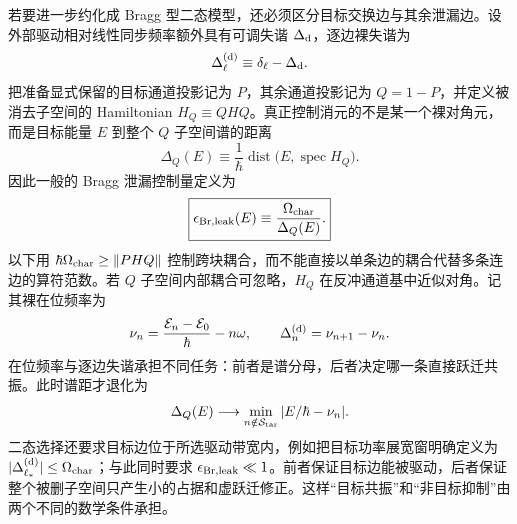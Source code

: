 若要进一步约化成 Bragg 型二态模型，还必须区分目标交换边与其余泄漏边。设外部驱动相对线性同步频率额外具有可调失谐 $\Delta_{\rm d}$，逐边裸失谐为
\begin{equation*}
\Delta_\ell^{(\rm d)}\equiv\delta_\ell-\Delta_{\rm d}.
\end{equation*}
把准备显式保留的目标通道投影记为 $P$，其余通道投影记为 $Q=1-P$，并定义被消去子空间的 Hamiltonian $H_Q\equiv QHQ$。真正控制消元的不是某一个裸对角元，而是目标能量 $E$ 到整个 $Q$ 子空间谱的距离
\begin{equation*}
\Delta_Q(E)
\equiv\frac1\hbar\operatorname{dist}\!\bigl(E,\operatorname{spec}H_Q\bigr).
\end{equation*}
因此一般的 Bragg 泄漏控制量定义为
\begin{equation}
\boxed{
\epsilon_{\rm Br,leak}(E)
\equiv\frac{\Omega_{\rm char}}{\Delta_Q(E)}.}
\label{eq:bragg_target_leakage_criterion_dp72}
\end{equation}
以下用 $\hbar\Omega_{\rm char}\ge\|PHQ\|$ 控制跨块耦合，而不能直接以单条边的耦合代替多条连边的算符范数。若 $Q$ 子空间内部耦合可忽略，$H_Q$ 在反冲通道基中近似对角。记其裸在位频率为
\[
\nu_n=\frac{\mathcal E_n-\mathcal E_0}{\hbar}-n\omega,
\qquad \Delta_n^{(\rm d)}=\nu_{n+1}-\nu_n.
\]
在位频率与逐边失谐承担不同任务：前者是谱分母，后者决定哪一条直接跃迁共振。此时谱距才退化为
\begin{equation*}
\Delta_Q(E)\longrightarrow
\min_{n\notin\mathcal S_{\rm tar}}|E/\hbar-\nu_n|.
\end{equation*}
二态选择还要求目标边位于所选驱动带宽内，例如把目标功率展宽窗明确定义为 $|\Delta_{\ell_*}^{(\rm d)}|\le\Omega_{\rm char}$；与此同时要求 $\epsilon_{\rm Br,leak}\ll1$。前者保证目标边能被驱动，后者保证整个被删子空间只产生小的占据和虚跃迁修正。这样“目标共振”和“非目标抑制”由两个不同的数学条件承担。

